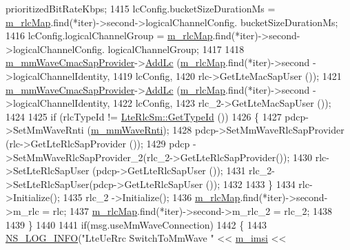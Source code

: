\begin{DoxyCode}
      prioritizedBitRateKbps;
1415           lcConfig.bucketSizeDurationMs =   \hyperlink{classns3_1_1LteUeRrc_a64b3948cda818827b8774d7a2be7ea4f}{m\_rlcMap}.find(*iter)->second->logicalChannelConfig.
      bucketSizeDurationMs;
1416           lcConfig.logicalChannelGroup =    \hyperlink{classns3_1_1LteUeRrc_a64b3948cda818827b8774d7a2be7ea4f}{m\_rlcMap}.find(*iter)->second->logicalChannelConfig.
      logicalChannelGroup;      
1417 
1418           \hyperlink{classns3_1_1LteUeRrc_ac48418b0f235043204868e73c073ec0b}{m\_mmWaveCmacSapProvider}->\hyperlink{classns3_1_1LteUeCmacSapProvider_a62f2d731c336ca14e98e95a3215e92ec}{AddLc} (\hyperlink{classns3_1_1LteUeRrc_a64b3948cda818827b8774d7a2be7ea4f}{m\_rlcMap}.find(*iter)->second
      ->logicalChannelIdentity, 
1419                                   lcConfig,
1420                                   rlc->GetLteMacSapUser ());
1421           \hyperlink{classns3_1_1LteUeRrc_ac48418b0f235043204868e73c073ec0b}{m\_mmWaveCmacSapProvider}->\hyperlink{classns3_1_1LteUeCmacSapProvider_a62f2d731c336ca14e98e95a3215e92ec}{AddLc} (\hyperlink{classns3_1_1LteUeRrc_a64b3948cda818827b8774d7a2be7ea4f}{m\_rlcMap}.find(*iter)->second
      ->logicalChannelIdentity,
1422                                             lcConfig,
1423                                             rlc\_2->GetLteMacSapUser ());
1424 
1425           \textcolor{keywordflow}{if} (rlcTypeId != \hyperlink{classns3_1_1LteRlcSm_a160bd39ce4e0d113dd5d93cc3a258045}{LteRlcSm::GetTypeId} ())
1426           \{
1427             pdcp->SetMmWaveRnti (\hyperlink{classns3_1_1LteUeRrc_a0bd0d5c3b49624be1fd217f96910f56a}{m\_mmWaveRnti});
1428             pdcp->SetMmWaveRlcSapProvider (rlc->GetLteRlcSapProvider ());
1429             pdcp ->SetMmWaveRlcSapProvider\_2(rlc\_2->GetLteRlcSapProvider());
1430             rlc->SetLteRlcSapUser (pdcp->GetLteRlcSapUser ());
1431             rlc\_2->SetLteRlcSapUser(pdcp->GetLteRlcSapUser ());
1432 
1433           \} 
1434           rlc->Initialize();
1435           rlc\_2 ->Initialize();
1436           \hyperlink{classns3_1_1LteUeRrc_a64b3948cda818827b8774d7a2be7ea4f}{m\_rlcMap}.find(*iter)->second->m\_rlc = rlc;
1437           \hyperlink{classns3_1_1LteUeRrc_a64b3948cda818827b8774d7a2be7ea4f}{m\_rlcMap}.find(*iter)->second->m\_rlc\_2 = rlc\_2;
1438 
1439         \}
1440 
1441         \textcolor{keywordflow}{if}(msg.useMmWaveConnection)
1442         \{
1443           \hyperlink{group__logging_gafbd73ee2cf9f26b319f49086d8e860fb}{NS\_LOG\_INFO}(\textcolor{stringliteral}{"LteUeRrc SwitchToMmWave "} << \hyperlink{classns3_1_1LteUeRrc_a1d825677309d17bdf729920f7dafd011}{m\_imsi} << 

\end{DoxyCode}
